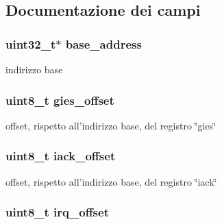 \subsection{Documentazione dei campi}
\hypertarget{structmy_g_p_i_o__t_a79c591d5fa42efdf86abd98347fece90}{
\subsubsection[{base\+\_\+address}]{\setlength{\rightskip}{0pt plus 5cm}uint32\+\_\+t$\ast$ base\+\_\+address}}\label{structmy_g_p_i_o__t_a79c591d5fa42efdf86abd98347fece90}
indirizzo base \hypertarget{structmy_g_p_i_o__t_a396df54cd6cf921c00ea28779db8de42}{
\subsubsection[{gies\+\_\+offset}]{\setlength{\rightskip}{0pt plus 5cm}uint8\+\_\+t gies\+\_\+offset}}\label{structmy_g_p_i_o__t_a396df54cd6cf921c00ea28779db8de42}
offset, rispetto all'indirizzo base, del registro \char`\"{}gies\char`\"{} \hypertarget{structmy_g_p_i_o__t_a89b56f53628a6e25587385a964248793}{
\subsubsection[{iack\+\_\+offset}]{\setlength{\rightskip}{0pt plus 5cm}uint8\+\_\+t iack\+\_\+offset}}\label{structmy_g_p_i_o__t_a89b56f53628a6e25587385a964248793}
offset, rispetto all'indirizzo base, del registro \char`\"{}iack\char`\"{} \hypertarget{structmy_g_p_i_o__t_a75a81dd8e3333cb69aa4938d82b5e433}{
\subsubsection[{irq\+\_\+offset}]{\setlength{\rightskip}{0pt plus 5cm}uint8\+\_\+t irq\+\_\+offset}}\label{structmy_g_p_i_o__t_a75a81dd8e3333cb69aa4938d82b5e433}
